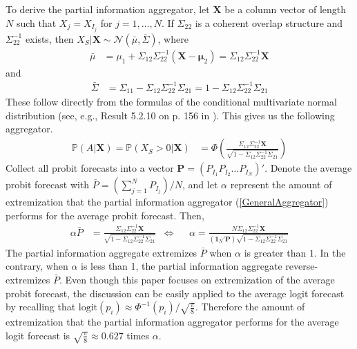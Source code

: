 \documentclass[11pt,twoside]{article}
\renewcommand{\P}{\mathbb{P}}
\theoremstyle{definition}
\theoremstyle{definition}
\begin{document}
To derive the partial information aggregator, let $\boldsymbol{X}$ be a column vector of length $N$ such that $X_j = X_{I_j}$ for $j = 1, \dots, N$. If $\Sigma_{22}$ is a coherent overlap structure and $\Sigma_{22}^{-1}$ exists, then $X_{S} | \boldsymbol{X} \sim \mathcal{N}(\bar{\mu}, \bar{\Sigma})$, where
\begin{align}
\bar{\mu} &= \mu_1 + \Sigma_{12} \Sigma_{22}^{-1} (\boldsymbol{X} - \boldsymbol{\mu}_2) =  \Sigma_{12} \Sigma_{22}^{-1} \boldsymbol{X} \label{condMu}
\end{align}
and
\begin{align}
 \bar{\Sigma}&= \Sigma_{11} - \Sigma_{12} \Sigma_{22}^{-1} \Sigma_{21} =1 - \Sigma_{12} \Sigma_{22}^{-1} \Sigma_{21}  \label{condSigma}
\end{align}
These follow directly from the formulas of the conditional multivariate normal distribution (see, e.g., Result 5.2.10 on p. 156 in \cite{ravishanker2001first}). This gives us the following aggregator. 
\begin{align}
\P\left(A  | \boldsymbol{X}\right)  = \P\left(X_{S} > 0 | \boldsymbol{X}\right) &= \Phi\left( \frac{\Sigma_{12} \Sigma_{22}^{-1} \boldsymbol{X}}{\sqrt{1 - \Sigma_{12} \Sigma_{22}^{-1} \Sigma_{21}}}\right) \label{GeneralAggregator}
\end{align}
Collect all probit forecasts into a vector $\boldsymbol{P} = (P_{I_1} P_{I_2} \dots P_{I_N})'$. Denote the average probit forecast with $\bar{P} = \left( \sum_{j=1}^N P_{I_j} \right)/N$, and let $\alpha$ represent the amount of extremization that the partial information aggregator (\ref{GeneralAggregator}) performs for the average probit forecast. Then,
\begin{align}
\alpha \bar{P}&=  \frac{\Sigma_{12} \Sigma_{22}^{-1} \boldsymbol{X}}{\sqrt{1 - \Sigma_{12} \Sigma_{22}^{-1} \Sigma_{21}}}  &\Leftrightarrow&& \alpha  = \frac{N \Sigma_{12} \Sigma_{22}^{-1} \boldsymbol{X}}{\left(\boldsymbol{1}_N' \boldsymbol{P} \right) \sqrt{1 - \Sigma_{12} \Sigma_{22}^{-1} \Sigma_{21}}} \label{alpha}
\end{align}
The partial information aggregate extremizes $\bar{P}$ when $\alpha$ is greater than $1$. In the contrary, when $\alpha$ is less than 1, the partial information aggregate reverse-extremizes $\bar{P}$. Even though this paper focuses on extremization of the average probit forecast, the discussion can be easily applied to the average logit forecast by recalling that $\text{logit}(p_i) \approx \Phi^{-1}(p_i)/\sqrt{\frac{\pi}{8}}$. Therefore the amount of extremization that the partial information aggregator performs for the average logit forecast is $\sqrt{\frac{\pi}{8}} \approx 0.627$ times $\alpha$.  
\end{document}
